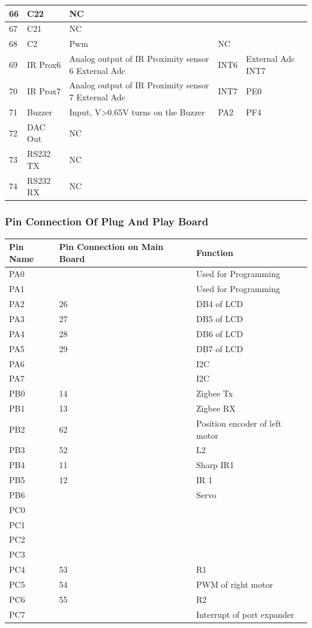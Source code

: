 \documentclass[a4paper,10pt,oneside]{article}
\begin{document}
{\begin{longtable}{|p{}|p{}|p{}|p{}|p{}|}
				66&	C22&	NC& &	\\ \hline
				67&	C21	& NC& &	\\ \hline
				68&	C2&Pwm&	NC &	\\ \hline
				69&	IR Prox6&	Analog output of IR Proximity sensor 6	External Adc &INT6 &	External Adc INT7\\ \hline
				70&	IR Prox7&	Analog output of IR Proximity sensor 7	External Adc &INT7 & PE0\\ \hline
				71&	Buzzer&	Input, V>0.65V turns on the Buzzer&	PA2 & PF4\\ \hline
				72&	DAC Out&	NC& &	\\ \hline
				73&	RS232 TX&	NC& &	\\ \hline
				74&	RS232 RX&	NC& &	\\ \hline

		\end{longtable}
	\subsubsection{Pin Connection Of Plug And Play Board}
		\begin{longtable}{|p{}|p{}|p{}|}\hline
			Pin Name&	Pin Connection on Main Board&	Function \\ \hline
			PA0&&	Used for Programming\\ \hline
			PA1&&	Used for Programming\\ \hline
			PA2&	26&	DB4 of LCD\\ \hline
			PA3&	27&	DB5 of LCD\\ \hline
			PA4&	28&	DB6 of LCD\\ \hline
			PA5&	29&	DB7 of LCD\\ \hline
			PA6&	&I2C\\ \hline
			PA7&	&I2C\\ \hline
			
			PB0&	14&	Zigbee Tx\\ \hline
			PB1&	13&	Zigbee RX\\ \hline
			PB2&	62&	Position encoder of left motor\\ \hline
			PB3&	52&	L2\\ \hline
			PB4&	11&	Sharp IR1\\ \hline
			PB5&	12&	IR 1\\ \hline
			PB6&	&	Servo\\ \hline
			PC0	&	&\\ \hline
			PC1&	&	\\ \hline
			PC2&	&	\\ \hline
			PC3&	&	\\ \hline
			PC4&	53&	R1\\ \hline
			PC5&	54&	PWM of right motor\\ \hline
			PC6&	55&	R2\\ \hline
			PC7&	&	Interrupt of port expander\\ \hline
			

\end{longtable}}
\end{document}
